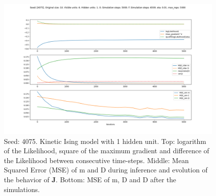 \documentclass{article}
\def\*#1{\mathbf{#1}}
\begin{document}
\begin{figure}[!htb]
    \centering
    \includegraphics[width=0.8\linewidth]{images/sqrt_size/[4075]_10_6_1_5000_6500_eta001_5000_100.png}
\caption{Seed: 4075. Kinetic Ising model with 1 hidden unit. Top: logarithm of the Likelihood, square of the maximum gradient and difference of the Likelihood between consecutive time-steps. Middle: Mean Squared Error (MSE) of m and D during inference and evolution of the behavior of $\*J$. Bottom: MSE of m, D and D after the simulations.}
\end{figure}





\end{document}

